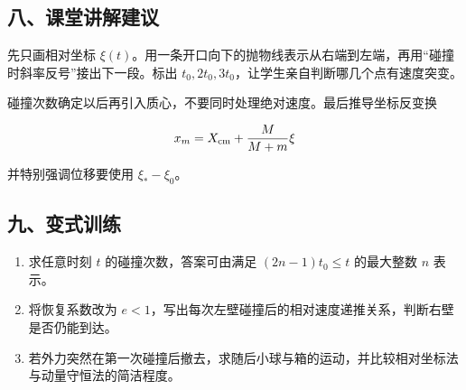 \documentclass[12pt,a4paper,UTF8]{ctexart}
\newcommand{\tightlist}{\setlength{\itemsep}{0pt}\setlength{\parskip}{0pt}}
\begin{document}
\subsection{八、课堂讲解建议}\label{ux516bux8bfeux5802ux8bb2ux89e3ux5efaux8bae-7}

先只画相对坐标
\(\xi(t)\)。用一条开口向下的抛物线表示从右端到左端，再用``碰撞时斜率反号''接出下一段。标出
\(t_0,2t_0,3t_0\)，让学生亲自判断哪几个点有速度突变。

碰撞次数确定以后再引入质心，不要同时处理绝对速度。最后推导坐标反变换

\[x_m=X_{\rm cm}+\frac{M}{M+m}\xi\]

并特别强调位移要使用 \(\xi_* -\xi_0\)。

\subsection{九、变式训练}\label{ux4e5dux53d8ux5f0fux8badux7ec3-7}

\begin{enumerate}
\def\labelenumi{\arabic{enumi}.}
\tightlist
\item
  求任意时刻 \(t\) 的碰撞次数，答案可由满足 \((2n-1)t_0\le t\)
  的最大整数 \(n\) 表示。
\item
  将恢复系数改为
  \(e<1\)，写出每次左壁碰撞后的相对速度递推关系，判断右壁是否仍能到达。
\item
  若外力突然在第一次碰撞后撤去，求随后小球与箱的运动，并比较相对坐标法与动量守恒法的简洁程度。
\end{enumerate}
\end{document}
